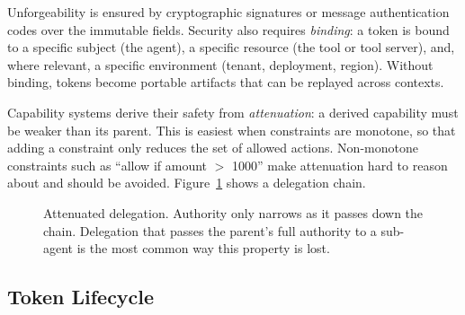 \documentclass[11pt]{book}
\begin{document}
Unforgeability is ensured by cryptographic signatures or message authentication codes over the immutable fields. Security also requires \textit{binding}: a token is bound to a specific subject (the agent), a specific resource (the tool or tool server), and, where relevant, a specific environment (tenant, deployment, region). Without binding, tokens become portable artifacts that can be replayed across contexts.

Capability systems derive their safety from \textit{attenuation}: a derived capability must be weaker than its parent. This is easiest when constraints are monotone, so that adding a constraint only reduces the set of allowed actions. Non-monotone constraints such as ``allow if amount $>$ 1000'' make attenuation hard to reason about and should be avoided. Figure~\ref{fig:attenuation} shows a delegation chain.

\begin{figure}[htbp]
\centering
{}
\caption{Attenuated delegation. Authority only narrows as it passes down the chain. Delegation that passes the parent's full authority to a sub-agent is the most common way this property is lost.}
\label{fig:attenuation}
\end{figure}

\subsection{Token Lifecycle}
\end{document}
